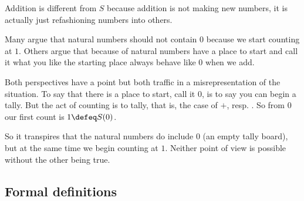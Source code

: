 Addition is different from $S$ because addition is not making new 
numbers, it is actually just refashioning numbers into others.  


\begin{remark}
    Many argue that natural numbers should not contain $0$ because we start counting 
    at $1$.  Others argue that because of natural numbers have a place to start 
    and call it what you like the starting place always behave like $0$ when we add.

    Both perspectives have a point but both traffic in a misrepresentation of the 
    situation.  To say that there is a place to start, call it 0, is to say 
    you can begin a tally.  But the act of counting is to tally, that is, the case 
    of $+$, resp. . So from $0$ our first count is $1\defeq S(0)$. 
    
    So it transpires that the
    natural numbers do include $0$ (an empty tally board), but at the same time
    we begin counting at $1$.  Neither point of view is possible without the other
    being true.
\end{remark}


    
\subsection{Formal definitions}

